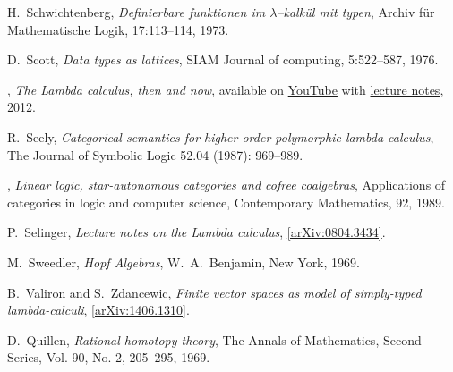 \documentclass[english,letter paper,12pt,reqno]{article}
\theoremstyle{example}
\begin{document}
\begin{thebibliography}{BHLS03}

H.~Schwichtenberg, \textsl{Definierbare funktionen im $\lambda$--kalk\"ul mit typen}, Archiv f\"ur Mathematische Logik, 17:113–114, 1973.

D.~Scott, \textsl{Data types as lattices}, SIAM Journal of computing, 5:522--587, 1976.

\bysame, \textsl{The {L}ambda calculus, then and now}, available on \href{http://www.youtube.com/watch?v=7cPtCpyBPNI}{YouTube} with \href{http://turing100.acm.org/lambda_calculus_timeline.pdf}{lecture notes}, 2012.

R.~Seely, \textsl{Categorical semantics for higher order polymorphic lambda calculus}, The Journal of Symbolic Logic 52.04 (1987): 969--989.

\bysame, \textsl{Linear logic, star-autonomous categories and cofree coalgebras}, Applications of categories in logic and computer science, Contemporary Mathematics, 92, 1989.

P.~Selinger, \textsl{Lecture notes on the {L}ambda calculus}, \href{http://arxiv.org/abs/0804.3434}{[arXiv:0804.3434]}.


  
M.~Sweedler, \textsl{Hopf Algebras}, W.~A.~Benjamin, New York, 1969.

B.~Valiron and S.~Zdancewic, \textsl{Finite vector spaces as model of simply-typed lambda-calculi}, \href{http://arxiv.org/abs/1406.1310v1}{[arXiv:1406.1310]}.

D.~Quillen, \textsl{Rational homotopy theory}, The Annals of Mathematics, Second Series, Vol. 90, No. 2, 205--295, 1969.


  

\end{thebibliography}
\end{document}
